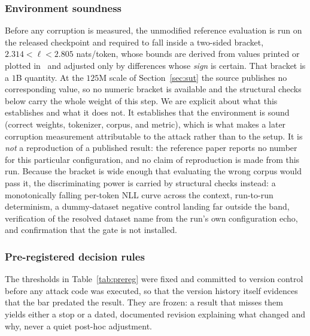 \documentclass[journal]{IEEEtran}
\begin{document}
\subsubsection{Environment soundness}
\label{sec:soundness}
Before any corruption is measured, the unmodified reference evaluation is run on the
released checkpoint and required to fall inside a two-sided bracket,
$2.314 < \ell < 2.805$ nats/token, whose bounds are derived from values printed or
plotted in~\cite{tandon2025tttE2E} and adjusted only by differences whose \emph{sign}
is certain. That bracket is a $1$B quantity. At the $125$M scale of
Section~\ref{sec:sut} the source publishes no corresponding value, so no numeric
bracket is available and the structural checks below carry the whole weight of this
step. We are explicit about what this establishes and what it does not. It
establishes that the environment is sound (correct weights, tokenizer, corpus, and
metric), which is what makes a later corruption measurement attributable to the
attack rather than to the setup. It is \emph{not} a reproduction of a published
result: the reference paper reports no number for this particular configuration, and
no claim of reproduction is made from this run. Because the bracket is wide enough
that evaluating the wrong corpus would pass it, the discriminating power is carried
by structural checks instead: a monotonically falling per-token NLL curve across the
context, run-to-run determinism, a dummy-dataset negative control landing far outside
the band, verification of the resolved dataset name from the run's own configuration
echo, and confirmation that the gate is not installed.

\subsubsection{Pre-registered decision rules}
\label{sec:prereg}
The thresholds in Table~\ref{tab:prereg} were fixed and committed to version control
before any attack code was executed, so that the version history itself evidences
that the bar predated the result. They are frozen: a result that misses them yields
either a stop or a dated, documented revision explaining what changed and why, never
a quiet post-hoc adjustment.
\end{document}
